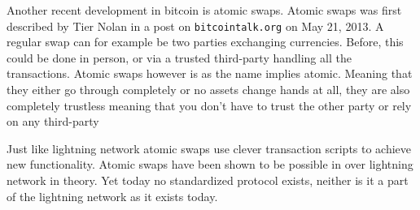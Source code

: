 
Another recent development in bitcoin is atomic swaps. Atomic swaps was first described by Tier Nolan in a post on
\texttt{bitcointalk.org} on May 21, 2013.\cite{tier_nolan}
A regular swap can for example be two parties exchanging currencies. Before,
this could be done in person, or via a trusted third-party handling all the
transactions. Atomic swaps however is as the name implies atomic. Meaning that
they either go through completely or no assets change hands at all, they are
also completely trustless meaning that you don't have to trust the
other party or rely on any third-party

Just like lightning network atomic swaps use clever transaction scripts to
achieve new functionality. Atomic swaps have been shown to be possible in over
lightning network in theory. Yet today no standardized protocol exists, neither is it a part of the lightning network as it exists today.


